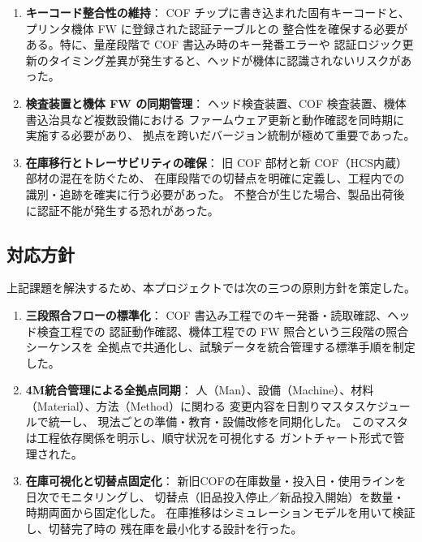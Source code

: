 \documentclass[journal,twocolumn]{IEEEtran}
\begin{document}
\begin{enumerate}
  \item \textbf{キーコード整合性の維持}：  
  COF チップに書き込まれた固有キーコードと、プリンタ機体 FW に登録された認証テーブルとの
  整合性を確保する必要がある。特に、量産段階で COF 書込み時のキー発番エラーや
  認証ロジック更新のタイミング差異が発生すると、ヘッドが機体に認識されないリスクがあった。
  
  \item \textbf{検査装置と機体 FW の同期管理}：  
  ヘッド検査装置、COF 検査装置、機体書込治具など複数設備における
  ファームウェア更新と動作確認を同時期に実施する必要があり、
  拠点を跨いだバージョン統制が極めて重要であった。
  
  \item \textbf{在庫移行とトレーサビリティの確保}：  
  旧 COF 部材と新 COF（HCS内蔵）部材の混在を防ぐため、
  在庫段階での切替点を明確に定義し、工程内での識別・追跡を確実に行う必要があった。
  不整合が生じた場合、製品出荷後に認証不能が発生する恐れがあった。
\end{enumerate}

\subsection{対応方針}
上記課題を解決するため、本プロジェクトでは次の三つの原則方針を策定した。

\begin{enumerate}
  \item \textbf{三段照合フローの標準化}：  
  COF 書込み工程でのキー発番・読取確認、ヘッド検査工程での
  認証動作確認、機体工程での FW 照合という三段階の照合シーケンスを
  全拠点で共通化し、試験データを統合管理する標準手順を制定した。
  
  \item \textbf{4M統合管理による全拠点同期}：  
  人（Man）、設備（Machine）、材料（Material）、方法（Method）に関わる
  変更内容を日割りマスタスケジュールで統一し、
  現法ごとの準備・教育・設備改修を同期化した。
  このマスタは工程依存関係を明示し、順守状況を可視化する
  ガントチャート形式で管理された。
  
  \item \textbf{在庫可視化と切替点固定化}：  
  新旧COFの在庫数量・投入日・使用ラインを日次でモニタリングし、
  切替点（旧品投入停止／新品投入開始）を数量・時期両面から固定化した。
  在庫推移はシミュレーションモデルを用いて検証し、切替完了時の
  残在庫を最小化する設計を行った。
\end{enumerate}
\end{document}
